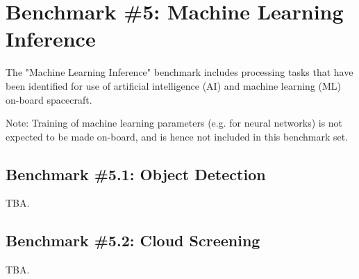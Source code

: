 \section{Benchmark \#5: Machine Learning Inference}
The "Machine Learning Inference" benchmark includes processing tasks that have been identified for use of artificial intelligence (AI) and machine learning (ML) on-board spacecraft.

Note: Training of machine learning parameters (e.g. for neural networks) is not expected to be made on-board, and is hence not included in this benchmark set.

\subsection{Benchmark \#5.1: Object Detection}
TBA.

\subsection{Benchmark \#5.2: Cloud Screening}
TBA.
